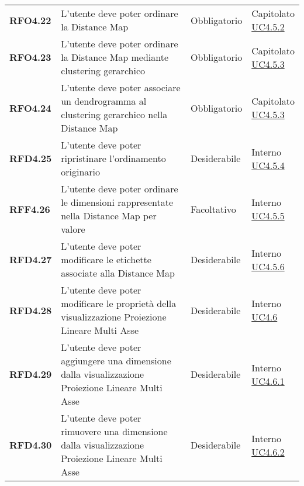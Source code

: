 \begin{longtable}[H]{>{\raggedright\bfseries}m{20mm} >{\raggedright}m{90mm} >{\raggedright}m{28mm} >{\raggedright\arraybackslash}m{30mm}}
    RFO4.22
    & L'utente deve poter ordinare la Distance Map
    & Obbligatorio
    & \makecell{ Capitolato \\ \hyperref[par:uc4.5.2]{UC4.5.2} }\\

    RFO4.23
    & L'utente deve poter ordinare la Distance Map mediante clustering gerarchico
    & Obbligatorio
    & \makecell{ Capitolato \\ \hyperref[par:uc4.5.3]{UC4.5.3} }\\

    RFO4.24
    & L'utente deve poter associare un dendrogramma al clustering gerarchico nella Distance Map
    & Obbligatorio
    & \makecell{ Capitolato \\ \hyperref[par:uc4.5.2]{UC4.5.3} }\\

    RFD4.25
    & L'utente deve poter ripristinare l'ordinamento originario
    & Desiderabile
    & \makecell{ Interno \\ \hyperref[par:uc4.5.4]{UC4.5.4} }\\

    RFF4.26
    & L'utente deve poter ordinare le dimensioni rappresentate nella Distance Map per valore
    & Facoltativo
    & \makecell{ Interno \\ \hyperref[par:uc4.5.5]{UC4.5.5} }\\

    RFD4.27
    & L'utente deve poter modificare le etichette associate alla Distance Map
    & Desiderabile
    & \makecell{ Interno \\ \hyperref[par:uc4.5.6]{UC4.5.6} }\\

    RFD4.28
    & L'utente deve poter modificare le proprietà della visualizzazione Proiezione Lineare Multi Asse
    & Desiderabile
    & \makecell{ Interno \\  \hyperref[par:uc4.6.1]{UC4.6} }\\

    RFD4.29
    & L'utente deve poter aggiungere una dimensione dalla visualizzazione Proiezione Lineare Multi Asse
    & Desiderabile
    & \makecell{ Interno \\  \hyperref[par:uc4.6.1]{UC4.6.1} }\\

    RFD4.30
    & L'utente deve poter rimuovere una dimensione dalla visualizzazione Proiezione Lineare Multi Asse
    & Desiderabile
    & \makecell{ Interno \\  \hyperref[par:uc4.6.2]{UC4.6.2} }\\


\end{longtable}
